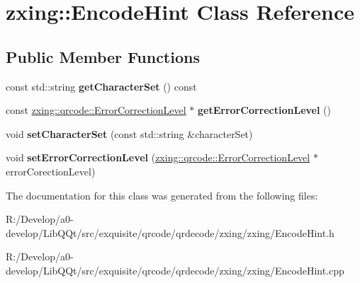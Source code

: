 \hypertarget{classzxing_1_1_encode_hint}{}\section{zxing\+:\+:Encode\+Hint Class Reference}
\label{classzxing_1_1_encode_hint}
\subsection*{Public Member Functions}
\begin{DoxyCompactItemize}
\item 
\mbox{\label{classzxing_1_1_encode_hint_a5ce762fed2c795132814b44636e75f80}} 
const std\+::string {\bfseries get\+Character\+Set} () const
\item 
\mbox{\label{classzxing_1_1_encode_hint_aea457778e8ac1d1cebd6de3529eaa8cf}} 
const \mbox{\hyperlink{classzxing_1_1qrcode_1_1_error_correction_level}{zxing\+::qrcode\+::\+Error\+Correction\+Level}} $\ast$ {\bfseries get\+Error\+Correction\+Level} ()
\item 
\mbox{\label{classzxing_1_1_encode_hint_a25cbf68bc59bdc710b9c44fe3ec6d235}} 
void {\bfseries set\+Character\+Set} (const std\+::string \&character\+Set)
\item 
\mbox{\label{classzxing_1_1_encode_hint_afc6fd46f63fb562ca0ae7ca38f51c63c}} 
void {\bfseries set\+Error\+Correction\+Level} (\mbox{\hyperlink{classzxing_1_1qrcode_1_1_error_correction_level}{zxing\+::qrcode\+::\+Error\+Correction\+Level}} $\ast$error\+Corection\+Level)
\end{DoxyCompactItemize}


The documentation for this class was generated from the following files\+:\begin{DoxyCompactItemize}
\item 
R\+:/\+Develop/a0-\/develop/\+Lib\+Q\+Qt/src/exquisite/qrcode/qrdecode/zxing/zxing/Encode\+Hint.\+h\item 
R\+:/\+Develop/a0-\/develop/\+Lib\+Q\+Qt/src/exquisite/qrcode/qrdecode/zxing/zxing/Encode\+Hint.\+cpp\end{DoxyCompactItemize}
